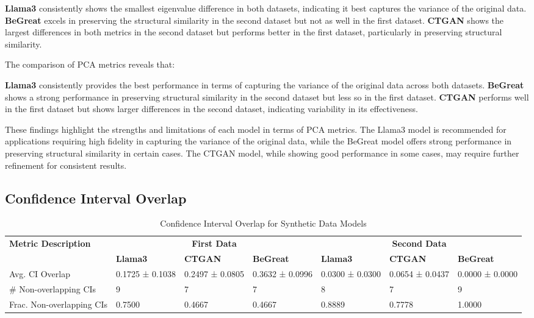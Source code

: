 \textbf{Llama3} consistently shows the smallest eigenvalue difference in both datasets, indicating it best captures the variance of the original data.
\textbf{BeGreat} excels in preserving the structural similarity in the second dataset but not as well in the first dataset.
\textbf{CTGAN} shows the largest differences in both metrics in the second dataset but performs better in the first dataset, particularly in preserving structural similarity.

\vspace{0.5cm}

The comparison of PCA metrics reveals that:

\textbf{Llama3} consistently provides the best performance in terms of capturing the variance of the original data across both datasets.
\textbf{BeGreat} shows a strong performance in preserving structural similarity in the second dataset but less so in the first dataset.
\textbf{CTGAN} performs well in the first dataset but shows larger differences in the second dataset, indicating variability in its effectiveness.

\vspace{0.5cm}

These findings highlight the strengths and limitations of each model in terms of PCA metrics. The Llama3 model is recommended for applications requiring high fidelity in capturing the variance of the original data, while the BeGreat model offers strong performance in preserving structural similarity in certain cases. The CTGAN model, while showing good performance in some cases, may require further refinement for consistent results.








\subsection{Confidence Interval Overlap}

\begin{table}[H]
\centering
\caption{Confidence Interval Overlap for Synthetic Data Models}
\label{tab:ci_overlap_combined}
\begin{tabularx}{\textwidth}{l*{6}{X}}
    \toprule
    \textbf{Metric Description} & \multicolumn{3}{c}{\textbf{First Data}} & \multicolumn{3}{c}{\textbf{Second Data}} \\
    \cmidrule(lr){2-4} \cmidrule(lr){5-7}
    & \textbf{Llama3} & \textbf{CTGAN} & \textbf{BeGreat} & \textbf{Llama3} & \textbf{CTGAN} & \textbf{BeGreat} \\
    \midrule
    Avg. CI Overlap & 0.1725 ± 0.1038 & 0.2497 ± 0.0805 & 0.3632 ± 0.0996 & 0.0300 ± 0.0300 & 0.0654 ± 0.0437 & 0.0000 ± 0.0000 \\
    \# Non-overlapping CIs & 9 & 7 & 7 & 8 & 7 & 9 \\
    Frac. Non-overlapping CIs & 0.7500 & 0.4667 & 0.4667 & 0.8889 & 0.7778 & 1.0000 \\
    \bottomrule
\end{tabularx}
\end{table}



